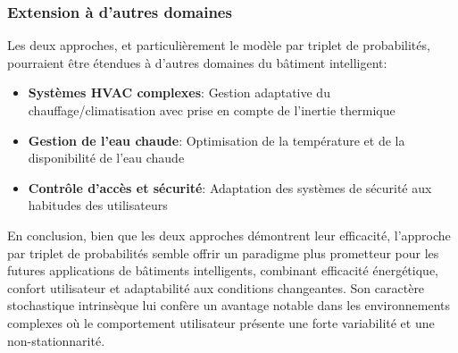 \subsubsection{Extension à d'autres domaines}

Les deux approches, et particulièrement le modèle par triplet de probabilités, pourraient être étendues à d'autres domaines du bâtiment intelligent:

\begin{itemize}
    \item \textbf{Systèmes HVAC complexes}: Gestion adaptative du chauffage/climatisation avec prise en compte de l'inertie thermique
    \item \textbf{Gestion de l'eau chaude}: Optimisation de la température et de la disponibilité de l'eau chaude
    \item \textbf{Contrôle d'accès et sécurité}: Adaptation des systèmes de sécurité aux habitudes des utilisateurs
\end{itemize}

En conclusion, bien que les deux approches démontrent leur efficacité, l'approche par triplet de probabilités semble offrir un paradigme plus prometteur pour les futures applications de bâtiments intelligents, combinant efficacité énergétique, confort utilisateur et adaptabilité aux conditions changeantes. Son caractère stochastique intrinsèque lui confère un avantage notable dans les environnements complexes où le comportement utilisateur présente une forte variabilité et une non-stationnarité.
